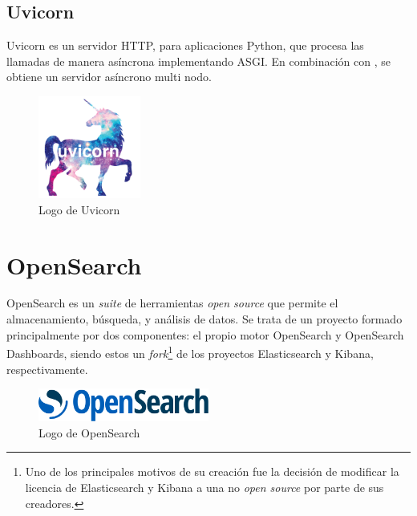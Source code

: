 \subsection{Uvicorn}

Uvicorn es un servidor HTTP, para aplicaciones Python, que procesa las llamadas de manera asíncrona implementando ASGI. En combinación con , se obtiene un servidor asíncrono multi nodo. \emph{\parencite{Reference16}}

\begin{figure}[ht]
    \centering
    \includegraphics[width=0.3\textwidth]{Figures/uvicorn-logo}
    \decoRule
    \caption[Uvicorn (Logo)]{Logo de Uvicorn \emph{\parencite{Reference16}}}
    \label{fig:uvicorn-logo}
\end{figure}


\section{OpenSearch}\label{sec:opensearch}

OpenSearch es un \emph{suite} de herramientas \emph{open source} que permite el almacenamiento, búsqueda, y análisis de datos. Se trata de un proyecto formado principalmente por dos componentes: el propio motor OpenSearch y OpenSearch Dashboards, siendo estos un \emph{fork}\footnote{Uno de los principales motivos de su creación fue la decisión de modificar la licencia de Elasticsearch y Kibana a una no \emph{open source} por parte de sus creadores.} de los proyectos Elasticsearch y Kibana, respectivamente. \emph{\parencite{Reference17}}

\begin{figure}[ht]
    \centering
    \includegraphics[width=0.5\textwidth]{Figures/opensearch-logo}
    \decoRule
    \caption[OpenSearch (Logo)]{Logo de OpenSearch \emph{\parencite{Reference17}}}
    \label{fig:opensearch-logo}
\end{figure}


